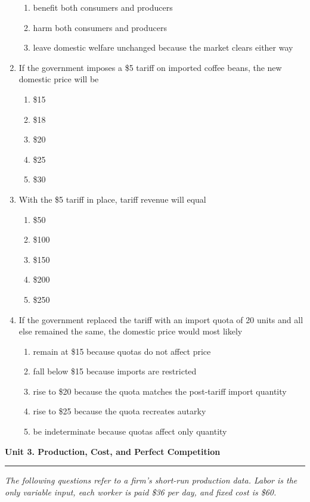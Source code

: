 \documentclass[10pt]{article}
\newenvironment{choiceslist}
  {\begin{enumerate}[label=(\Alph*), leftmargin=1.6em, itemsep=0.12em, topsep=0.18em, parsep=0pt]}
  {\end{enumerate}}
\newenvironment{stimulus}
  {\begin{center}\begin{minipage}{0.96\columnwidth}\footnotesize\itshape\setlength{\tabcolsep}{3pt}\renewcommand{\arraystretch}{0.96}}
  {\end{minipage}\end{center}}
\newcommand{\unitheader}[2]{%
  \vspace{0.35em}
  {\large\bfseries Unit #1. #2\par}
  \vspace{0.2em}
  \hrule
  \vspace{0.45em}
}
\begin{document}
\begin{multicols*}{2}
\begin{enumerate}[resume*=apq, leftmargin=*, itemsep=0.85em, topsep=0.2em, parsep=0pt]
\begin{choiceslist}
\item benefit both consumers and producers
\item harm both consumers and producers
\item leave domestic welfare unchanged because the market clears either way
\end{choiceslist}
\item If the government imposes a \$5 tariff on imported coffee beans, the new domestic price will be
\begin{choiceslist}
\item \$15
\item \$18
\item \$20
\item \$25
\item \$30
\end{choiceslist}
\item With the \$5 tariff in place, tariff revenue will equal
\begin{choiceslist}
\item \$50
\item \$100
\item \$150
\item \$200
\item \$250
\end{choiceslist}
\item If the government replaced the tariff with an import quota of 20 units and all else remained the same, the domestic price would most likely
\begin{choiceslist}
\item remain at \$15 because quotas do not affect price
\item fall below \$15 because imports are restricted
\item rise to \$20 because the quota matches the post-tariff import quantity
\item rise to \$25 because the quota recreates autarky
\item be indeterminate because quotas affect only quantity
\end{choiceslist}
\end{enumerate}
\unitheader{3}{Production, Cost, and Perfect Competition}
\begin{stimulus}
The following questions refer to a firm's short-run production data. Labor is the only variable input, each worker is paid \$36 per day, and fixed cost is \$60.


\end{stimulus}
\end{multicols*}
\end{document}
